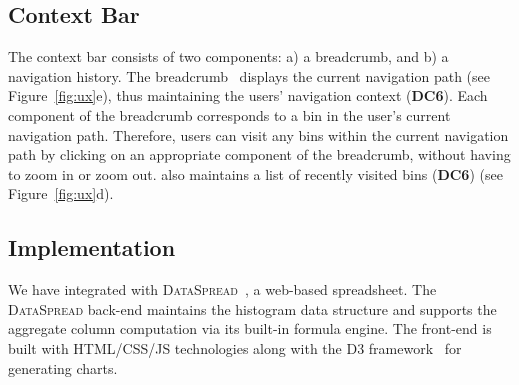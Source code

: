 \subsection{Context Bar}
The context bar consists of two components:
a) a breadcrumb, and b) a navigation history.
The breadcrumb~\cite{breadcrumb} displays the current navigation path (see Figure~\ref{fig:ux}e), thus maintaining the users' navigation context (\textbf{DC6}). Each component of the breadcrumb corresponds to a bin in the user's current navigation path. Therefore, users can visit any bins within the current navigation path by clicking on an appropriate component of the breadcrumb, without having to zoom in or zoom out. \noah also maintains a list of recently visited bins (\textbf{DC6})
(see Figure~\ref{fig:ux}d). 

\subsection{Implementation}
We have integrated \noah with {\scshape DataSpread}~\cite{datamodels}, a web-based spreadsheet. The {\scshape DataSpread} back-end maintains the histogram data structure and  supports the aggregate column computation via its built-in formula engine. The \noah front-end is built with HTML/CSS/JS technologies along with the D3 framework~\cite{d3} for generating charts.






